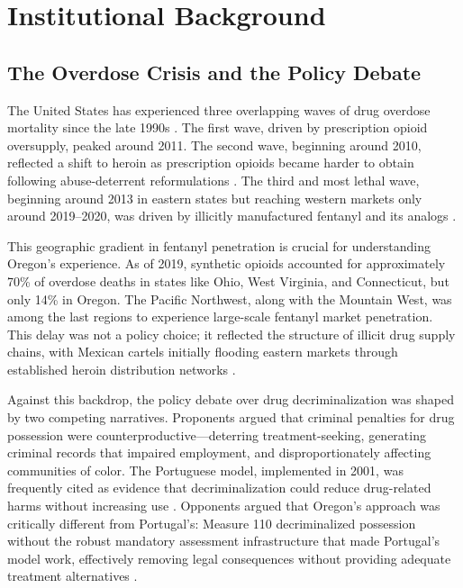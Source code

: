 \documentclass[12pt]{article}
\begin{document}
\section{Institutional Background}

\subsection{The Overdose Crisis and the Policy Debate}

The United States has experienced three overlapping waves of drug overdose mortality since the late 1990s \citep{deathsofdespair2015, casedeaton2020}. The first wave, driven by prescription opioid oversupply, peaked around 2011. The second wave, beginning around 2010, reflected a shift to heroin as prescription opioids became harder to obtain following abuse-deterrent reformulations \citep{alpert2018supply}. The third and most lethal wave, beginning around 2013 in eastern states but reaching western markets only around 2019--2020, was driven by illicitly manufactured fentanyl and its analogs \citep{powell2020fentanyl}.

This geographic gradient in fentanyl penetration is crucial for understanding Oregon's experience. As of 2019, synthetic opioids accounted for approximately 70\% of overdose deaths in states like Ohio, West Virginia, and Connecticut, but only 14\% in Oregon. The Pacific Northwest, along with the Mountain West, was among the last regions to experience large-scale fentanyl market penetration. This delay was not a policy choice; it reflected the structure of illicit drug supply chains, with Mexican cartels initially flooding eastern markets through established heroin distribution networks \citep{quinones2015dreamland}.

Against this backdrop, the policy debate over drug decriminalization was shaped by two competing narratives. Proponents argued that criminal penalties for drug possession were counterproductive---deterring treatment-seeking, generating criminal records that impaired employment, and disproportionately affecting communities of color. The Portuguese model, implemented in 2001, was frequently cited as evidence that decriminalization could reduce drug-related harms without increasing use \citep{hughes2010portuguese, portugal2001drug}. Opponents argued that Oregon's approach was critically different from Portugal's: Measure 110 decriminalized possession without the robust mandatory assessment infrastructure that made Portugal's model work, effectively removing legal consequences without providing adequate treatment alternatives \citep{morgan2023measure110}.
\end{document}
